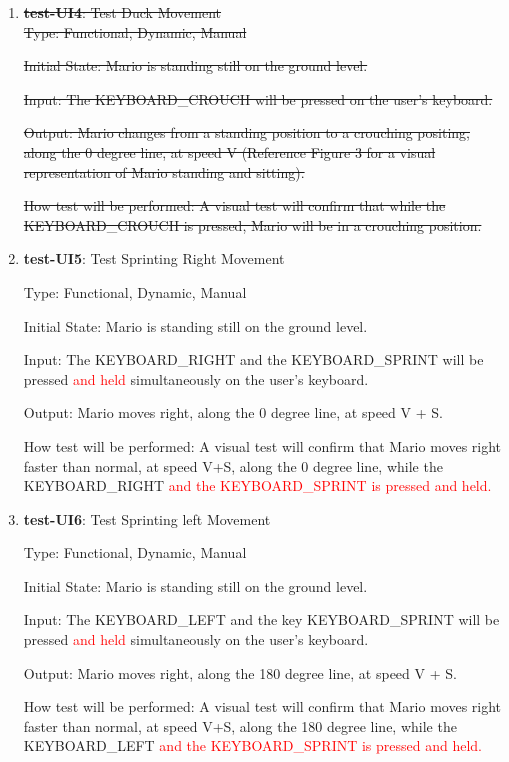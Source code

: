 \documentclass[12pt, titlepage]{article}
\begin{document}
\begin{enumerate}
\item{}
\sout{\textbf{test-UI4}: Test Duck Movement}\\

\sout{Type: Functional, Dynamic, Manual}

\sout{Initial State: Mario is standing still on the ground level.}

\sout{Input: The KEYBOARD\_CROUCH will be pressed on the user's keyboard.}

\sout{Output: Mario changes from a standing position to a crouching positing, along the 0 degree line, at speed V (Reference Figure 3 for a visual representation of Mario standing and sitting).}

\sout{How test will be performed: A visual test will confirm that while the KEYBOARD\_CROUCH is pressed, Mario will be in a crouching position.}

\item{\textbf{test-UI5}: Test Sprinting Right Movement\\}

Type: Functional, Dynamic, Manual

Initial State: Mario is standing still on the ground level.

Input: The KEYBOARD\_RIGHT and the KEYBOARD\_SPRINT will be pressed \textcolor{red}{and held} simultaneously on the user's keyboard.

Output: Mario moves right, along the 0 degree line, at speed V + S.

How test will be performed: A visual test will confirm that Mario moves right faster than normal, at speed V+S, along the 0 degree line, while the KEYBOARD\_RIGHT \textcolor{red}{and the KEYBOARD\_SPRINT is pressed and held.}

\item{\textbf{test-UI6}: Test Sprinting left Movement\\}

Type: Functional, Dynamic, Manual

Initial State: Mario is standing still on the ground level.

Input: The KEYBOARD\_LEFT and the key KEYBOARD\_SPRINT will be pressed \textcolor{red}{and held} simultaneously on the user's keyboard.

Output: Mario moves right, along the 180 degree line, at speed V + S.

How test will be performed: A visual test will confirm that Mario moves right faster than normal, at speed V+S, along the 180 degree line, while the KEYBOARD\_LEFT \textcolor{red}{and the KEYBOARD\_SPRINT is pressed and held.}


\end{enumerate}
\end{document}
